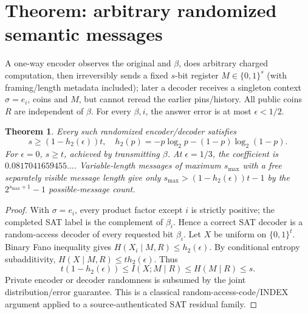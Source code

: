 \documentclass[11pt]{article}
\newtheorem{theorem}{Theorem}
\begin{document}
\section{Theorem: arbitrary randomized semantic messages}
A one-way encoder observes the original and $\beta$, does arbitrary charged computation, then irreversibly sends a fixed $s$-bit register $M\in\{0,1\}^s$ (with framing/length metadata included); later a decoder receives a singleton context $\sigma=e_i$, coins and $M$, but cannot reread the earlier pins/history. All public coins $R$ are independent of $\beta$. For every $\beta,i$, the answer error is at most $\epsilon<1/2$.
\begin{theorem}
Every such randomized encoder/decoder satisfies
\[
\boxed{s\ge(1-h_2(\epsilon))t},\quad h_2(p)=-p\log_2p-(1-p)\log_2(1-p).
\]
For $\epsilon=0$, $s\ge t$, achieved by transmitting $\beta$. At $\epsilon=1/3$, the coefficient is $0.0817041659455\ldots$. Variable-length messages of maximum $s_{\max}$ with a free separately visible message length give only $s_{\max}>(1-h_2(\epsilon))t-1$ by the $2^{s_{\max}+1}-1$ possible-message count.
\end{theorem}
\begin{proof}
With $\sigma=e_i$, every product factor except $i$ is strictly positive; the completed SAT label is the complement of $\beta_i$. Hence a correct SAT decoder is a random-access decoder of every requested bit $\beta_i$. Let $X$ be uniform on $\{0,1\}^t$. Binary Fano inequality gives $H(X_i\mid M,R)\le h_2(\epsilon)$. By conditional entropy subadditivity, $H(X\mid M,R)\le t h_2(\epsilon)$. Thus
\[
t(1-h_2(\epsilon))\le I(X;M\mid R)\le H(M\mid R)\le s.
\]
Private encoder or decoder randomness is subsumed by the joint distribution/error guarantee. This is a classical random-access-code/INDEX argument applied to a source-authenticated SAT residual family.
\end{proof}
\end{document}
